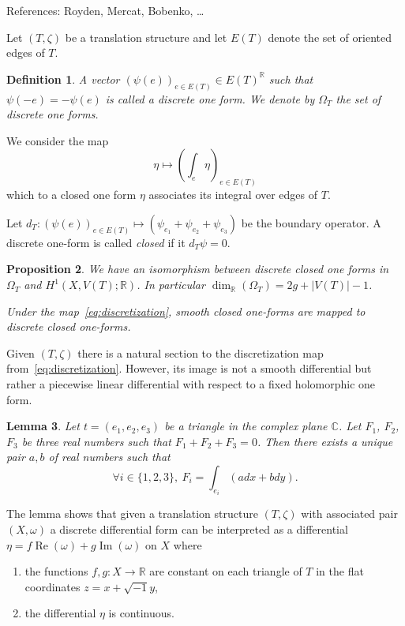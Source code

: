 \documentclass[a4paper,12pt]{article}
\def\bC{\mathbb{C}}
\def\bR{\mathbb{R}}
\def\Re{\operatorname{Re}}
\def\Im{\operatorname{Im}}
\newtheorem{definition}{Definition}
\newtheorem{lemma}[definition]{Lemma}
\newtheorem{proposition}[definition]{Proposition}
\begin{document}
References: Royden, Mercat, Bobenko, \ldots


Let $(T, \zeta)$ be a translation structure and let $E(T)$ denote the set of
oriented edges of $T$. 

\begin{definition}
A vector $(\psi(e))_{e \in E(T)} \in E(T)^\bR$ such that
$\psi(-e) = -\psi(e)$ is called a \emph{discrete one form}. We denote
by $\Omega_T$ the set of discrete one forms.
\end{definition}

We consider the map
\begin{equation}
\label{eq:discretization}
\eta \mapsto \left(\int_e \eta\right)_{e \in E(T)}
\end{equation}
which to a closed one form $\eta$ associates its integral over edges of $T$.

Let $d_T: (\psi(e))_{e \in E(T)} \mapsto (\psi_{e_1} + \psi_{e_2} + \psi_{e_3})$ be the boundary
operator. A discrete one-form is called \emph{closed} if it $d_T \psi = 0$.

\begin{proposition}
\label{prop:discreteAndSmoothOneForms}
We have an isomorphism between discrete closed one forms in $\Omega_T$ and
$H^1(X, V(T); \bR)$. In particular $\dim_\bR(\Omega_T) = 2g + |V(T)| - 1$.

Under the map~\eqref{eq:discretization}, smooth closed one-forms are mapped to discrete
closed one-forms.
\end{proposition}


Given $(T, \zeta)$ there is a natural section to the discretization map
from~\eqref{eq:discretization}. However, its image is not a smooth
differential but rather a piecewise linear differential with respect to a fixed
holomorphic one form.
\begin{lemma}
Let $t = (e_1, e_2, e_3)$ be a triangle in the complex plane $\bC$.
Let $F_1$, $F_2$, $F_3$ be three real numbers such that $F_1 + F_2 + F_3 = 0$.
Then there exists a unique pair $a,b$ of real numbers such that 
\[
\forall i \in \{1,2,3\},\ F_i = \int_{e_i} (a dx + b dy).
\]
\end{lemma}

The lemma shows that given a translation structure $(T, \zeta)$ with
associated pair $(X, \omega)$ a discrete differential form can
be interpreted as a differential
$\eta = f \Re(\omega) + g \Im(\omega)$ on $X$ where
\begin{enumerate}
\item the functions $f, g: X \to \bR$ are constant on each triangle of $T$ in the flat coordinates $z = x + \sqrt{-1} y$,
\item the differential $\eta$ is continuous.
\end{enumerate}
\end{document}
